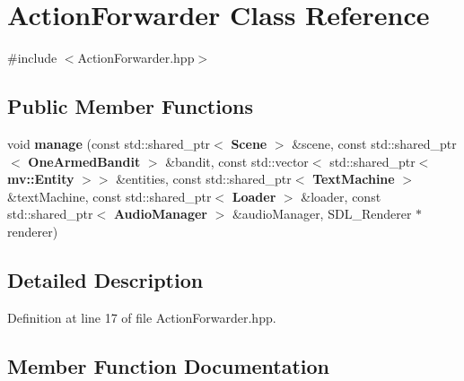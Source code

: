 \section{Action\+Forwarder Class Reference}
\label{class_action_forwarder}


{\ttfamily \#include $<$Action\+Forwarder.\+hpp$>$}

\subsection*{Public Member Functions}
\begin{DoxyCompactItemize}
\item 
void \textbf{ manage} (const std\+::shared\+\_\+ptr$<$ \textbf{ Scene} $>$ \&scene, const std\+::shared\+\_\+ptr$<$ \textbf{ One\+Armed\+Bandit} $>$ \&bandit, const std\+::vector$<$ std\+::shared\+\_\+ptr$<$ \textbf{ mv\+::\+Entity} $>$$>$ \&entities, const std\+::shared\+\_\+ptr$<$ \textbf{ Text\+Machine} $>$ \&text\+Machine, const std\+::shared\+\_\+ptr$<$ \textbf{ Loader} $>$ \&loader, const std\+::shared\+\_\+ptr$<$ \textbf{ Audio\+Manager} $>$ \&audio\+Manager, S\+D\+L\+\_\+\+Renderer $\ast$renderer)
\end{DoxyCompactItemize}


\subsection{Detailed Description}


Definition at line 17 of file Action\+Forwarder.\+hpp.



\subsection{Member Function Documentation}
\mbox{\label{class_action_forwarder_a9a0977b96d99bfb129d3d726950888cd}} 
